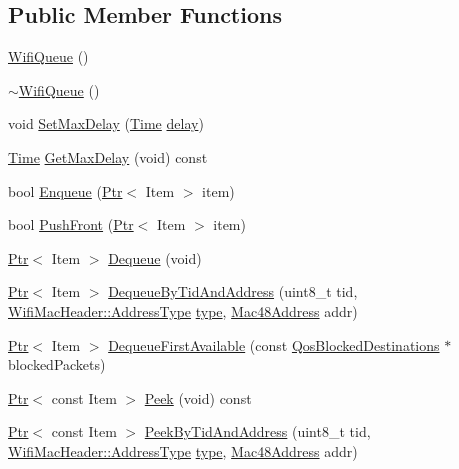 \subsection*{Public Member Functions}
\begin{DoxyCompactItemize}
\item 
\hyperlink{classns3_1_1WifiQueue_a888b5859d593427165427461dd1f93a9}{Wifi\+Queue} ()
\item 
\hyperlink{classns3_1_1WifiQueue_a3d326c61c93a37a613a5a88baa44db3e}{$\sim$\+Wifi\+Queue} ()
\item 
void \hyperlink{classns3_1_1WifiQueue_a6a051869c84005e58b3585f87fbb4f2b}{Set\+Max\+Delay} (\hyperlink{classns3_1_1Time}{Time} \hyperlink{mmwave_2model_2fading-traces_2fading__trace__generator_8m_a7964e6aa8f61a9d28973c8267a606ad8}{delay})
\item 
\hyperlink{classns3_1_1Time}{Time} \hyperlink{classns3_1_1WifiQueue_a95d0d7636ae39fde1dca1f79190a6339}{Get\+Max\+Delay} (void) const 
\item 
bool \hyperlink{classns3_1_1WifiQueue_a509b8de8ba7f9126ed3191cb4a91f87b}{Enqueue} (\hyperlink{classns3_1_1Ptr}{Ptr}$<$ Item $>$ item)
\item 
bool \hyperlink{classns3_1_1WifiQueue_a9e15ef91113057214a9972e4a2c9f8e9}{Push\+Front} (\hyperlink{classns3_1_1Ptr}{Ptr}$<$ Item $>$ item)
\item 
\hyperlink{classns3_1_1Ptr}{Ptr}$<$ Item $>$ \hyperlink{classns3_1_1WifiQueue_a32d8b3612cbb83a76f67c2956ce82627}{Dequeue} (void)
\item 
\hyperlink{classns3_1_1Ptr}{Ptr}$<$ Item $>$ \hyperlink{classns3_1_1WifiQueue_af0fa49618470fe6d53b879861fbd7926}{Dequeue\+By\+Tid\+And\+Address} (uint8\+\_\+t tid, \hyperlink{classns3_1_1WifiMacHeader_a17406db48973a8e8fb6d961dd35154fe}{Wifi\+Mac\+Header\+::\+Address\+Type} \hyperlink{visualizer-ideas_8txt_add98db9e15e2a58cf2b57623e7aa893a}{type}, \hyperlink{classns3_1_1Mac48Address}{Mac48\+Address} addr)
\item 
\hyperlink{classns3_1_1Ptr}{Ptr}$<$ Item $>$ \hyperlink{classns3_1_1WifiQueue_ab827ee78be5de8ac043504560b6be3f1}{Dequeue\+First\+Available} (const \hyperlink{classns3_1_1QosBlockedDestinations}{Qos\+Blocked\+Destinations} $\ast$blocked\+Packets)
\item 
\hyperlink{classns3_1_1Ptr}{Ptr}$<$ const Item $>$ \hyperlink{classns3_1_1WifiQueue_a4cbd048691e6feeaaaeb5bd61afba704}{Peek} (void) const 
\item 
\hyperlink{classns3_1_1Ptr}{Ptr}$<$ const Item $>$ \hyperlink{classns3_1_1WifiQueue_a3d1b48d3bd1fb7593955e5a42ff61aeb}{Peek\+By\+Tid\+And\+Address} (uint8\+\_\+t tid, \hyperlink{classns3_1_1WifiMacHeader_a17406db48973a8e8fb6d961dd35154fe}{Wifi\+Mac\+Header\+::\+Address\+Type} \hyperlink{visualizer-ideas_8txt_add98db9e15e2a58cf2b57623e7aa893a}{type}, \hyperlink{classns3_1_1Mac48Address}{Mac48\+Address} addr)

\end{DoxyCompactItemize}
